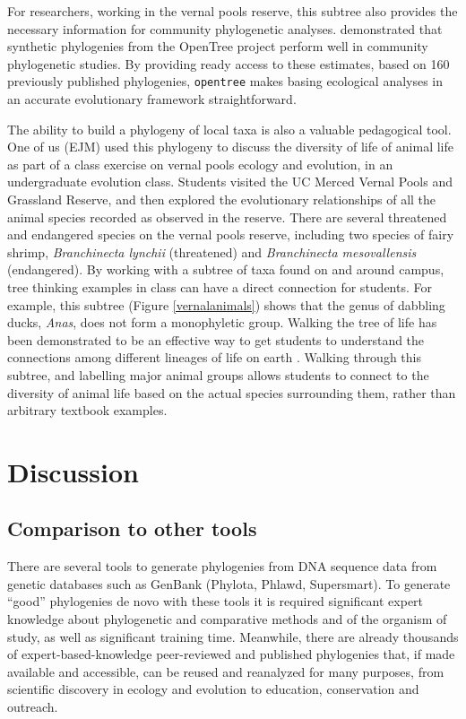 \documentclass[oupdraft]{sysbio_sse}
\begin{document}
For researchers, working in the vernal pools reserve, this subtree also provides the necessary information for community phylogenetic analyses. \citet{li_for_2019} demonstrated that synthetic phylogenies from the OpenTree project perform well in community phylogenetic studies. By providing ready access to these estimates, based on 160 previously published phylogenies, \texttt{opentree} makes basing ecological analyses in an accurate evolutionary framework straightforward.


The ability to build a phylogeny of local taxa is also a valuable pedagogical tool. One of us (EJM) used this phylogeny to discuss the diversity of life of animal life as part of a class exercise on vernal pools ecology and evolution, in an undergraduate evolution class.
Students visited the UC Merced Vernal Pools and Grassland Reserve, and then explored the evolutionary relationships of all the animal species recorded as observed in the reserve.
There are several threatened and endangered species on the vernal pools reserve, including two species of fairy shrimp, \textit{Branchinecta lynchii} (threatened) and \textit{Branchinecta mesovallensis} (endangered).
By working with a subtree of taxa found on and around campus, tree thinking examples in class can have a direct connection for students. For example, this subtree (Figure \ref{vernalanimals}) shows that the genus of dabbling ducks, \textit{Anas}, does not form a monophyletic group. Walking the tree of life has been demonstrated to be an effective way to get students to understand the connections among different lineages of life on earth \citep{ballen_walking_2017}. Walking through this subtree, and labelling major animal groups allows students to connect to the diversity of animal life based on the actual species surrounding them, rather than arbitrary textbook examples.

\bigskip
\section{Discussion}
\label{sec5}

\subsection{Comparison to other tools}

There are several tools to generate phylogenies from DNA sequence data from genetic databases such as GenBank (Phylota, Phlawd, Supersmart). To generate “good” phylogenies de novo with these tools it is required significant expert knowledge about phylogenetic and comparative methods and of the organism of study, as well as significant training time. Meanwhile, there are already thousands of expert-based-knowledge peer-reviewed and published phylogenies that, if made available and accessible, can be reused and reanalyzed for many purposes, from scientific discovery in ecology and evolution to education, conservation and outreach.
\end{document}
